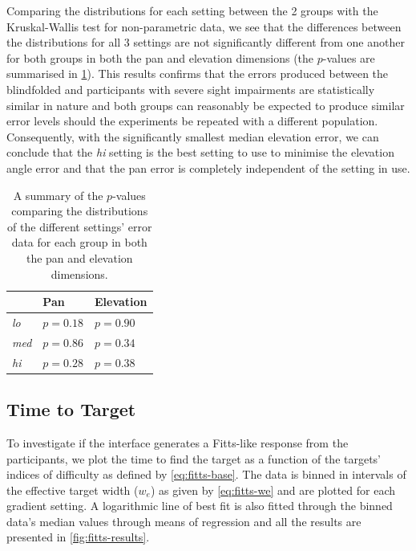 \documentclass[]{interact}
\begin{document}
Comparing the distributions for each setting between the 2 groups with the Kruskal-Wallis test for non-parametric data, we see that the differences between the distributions for all 3 settings are not significantly different from one another for both groups in both the pan and elevation dimensions (the $p$-values are summarised in \cref{tab:inter-group-results}).
This results confirms that the errors produced between the blindfolded and participants with severe sight impairments are statistically similar in nature and both groups can reasonably be expected to produce similar error levels should the experiments be repeated with a different population. 
Consequently, with the significantly smallest median elevation error, we can conclude that the \textit{hi} setting is the best setting to use to minimise the elevation angle error and that the pan error is completely independent of the setting in use. 

\begin{table}
  \centering
  \caption{A summary of the $p$-values comparing the distributions of the different settings' error data for each group in both the pan and elevation dimensions. }\label{tab:inter-group-results}
  \begin{tabular}{lll}
    \toprule
                   & Pan      & Elevation \\ \midrule
      \textit{lo}  & $p=0.18$ & $p=0.90$  \\
      \textit{med} & $p=0.86$ & $p=0.34$  \\
      \textit{hi}  & $p=0.28$ & $p=0.38$  \\
    \bottomrule
  \end{tabular}
\end{table}

\subsection{Time to Target}

To investigate if the interface generates a Fitts-like response from the participants, we plot the time to find the target as a function of the targets' indices of difficulty as defined by \cref{eq:fitts-base}.
The data is binned in intervals of the effective target width ($w_e$) as given by \cref{eq:fitts-we} and are plotted for each gradient setting. 
A logarithmic line of best fit is also fitted through the binned data's median values through means of regression and all the results are presented in \cref{fig:fitts-results}.
\end{document}
